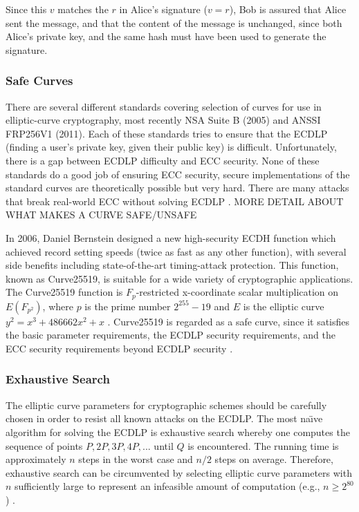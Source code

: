\documentclass[12pt,a4paper]{article}
\begin{document}
Since this $v$ matches the $r$ in Alice's signature ($v=r$), 
Bob is assured that Alice sent the message, and that the content of the message is unchanged, 
since both Alice's private key, and the same hash must have been used to generate the signature. 




\subsubsection{Safe Curves}\noindent \label{Safe Curves}
There are several different standards covering selection of curves for use in elliptic-curve cryptography, 
most recently NSA Suite B (2005) and ANSSI FRP256V1 (2011). 
Each of these standards tries to ensure that the ECDLP (finding a user's private key, given their public key) is difficult. 
Unfortunately, there is a gap between ECDLP difficulty and ECC security. 
None of these standards do a good job of ensuring ECC security, 
secure implementations of the standard curves are theoretically possible but very hard. 
There are many attacks that break real-world ECC without solving ECDLP \cite{bernstein2013safecurves}. 
MORE DETAIL ABOUT WHAT MAKES A CURVE SAFE/UNSAFE

In 2006, Daniel Bernstein designed a new high-security ECDH function which achieved record setting speeds (twice as fast as any other function), 
with several side benefits including state-of-the-art timing-attack protection. 
This function, known as Curve25519, is suitable for a wide variety of cryptographic applications. 
The Curve25519 function is $F_p$-restricted x-coordinate scalar multiplication on $E(F_{p^2})$, 
where $p$ is the prime number $2^{255} - 19$ and $E$ is the elliptic curve $y^2 = x^3 + 486662x^2 + x$ \cite{10.1007/11745853_14}.
Curve25519 is regarded as a safe curve, since it satisfies the basic parameter requirements, the ECDLP security requirements, 
and the ECC security requirements beyond ECDLP security \cite{bernstein2013safecurves}.

\subsubsection{Exhaustive Search}\noindent \label{Exhaustive Search}
The elliptic curve parameters for cryptographic schemes should be carefully chosen in order to resist all known attacks on the ECDLP. 
The most na\"{\i}ve algorithm for solving the ECDLP is exhaustive search whereby one computes the sequence of points $P,2P,3P,4P,...$ until $Q$ is encountered. 
The running time is approximately $n$ steps in the worst case and $n/2$ steps on average. 
Therefore, exhaustive search can be circumvented by selecting elliptic curve parameters with $n$ sufficiently large to represent an infeasible amount of computation (e.g., $n \geq 2^{80}$) \cite{hankerson2003guide}.
\end{document}
